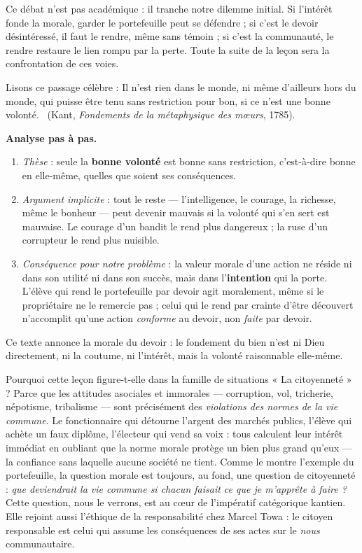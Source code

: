 \documentclass[11pt]{article}
\newcounter{popsec}
\newcounter{popsub}
\newcommand{\courssub}[1]{%
  \stepcounter{popsub}%
  \par\vspace{9pt}\noindent{\popxbold\fontsize{11.5}{13}\selectfont\color{popink}{\color{poporange}\thepopsec.\thepopsub}\hspace{6pt}#1}\par\nopagebreak\vspace{4pt}
}
\begin{document}
Ce débat n'est pas académique : il tranche notre dilemme initial. Si l'intérêt fonde la morale, garder le portefeuille peut se défendre ; si c'est le devoir désintéressé, il faut le rendre, même sans témoin ; si c'est la communauté, le rendre restaure le lien rompu par la perte. Toute la suite de la leçon sera la confrontation de ces voies.

\begin{experience}
Lisons ce passage célèbre : \guillemotleft Il n'est rien dans le monde, ni même d'ailleurs hors du monde, qui puisse être tenu sans restriction pour bon, si ce n'est une bonne volonté. \guillemotright\ (Kant, \emph{Fondements de la métaphysique des mœurs}, 1785).

\textbf{Analyse pas à pas.}
\begin{enumerate}
  \item \emph{Thèse} : seule la \textbf{bonne volonté} est bonne sans restriction, c'est-à-dire bonne en elle-même, quelles que soient ses conséquences.
  \item \emph{Argument implicite} : tout le reste — l'intelligence, le courage, la richesse, même le bonheur — peut devenir mauvais si la volonté qui s'en sert est mauvaise. Le courage d'un bandit le rend plus dangereux ; la ruse d'un corrupteur le rend plus nuisible.
  \item \emph{Conséquence pour notre problème} : la valeur morale d'une action ne réside ni dans son utilité ni dans son succès, mais dans l'\textbf{intention} qui la porte. L'élève qui rend le portefeuille par devoir agit moralement, même si le propriétaire ne le remercie pas ; celui qui le rend par crainte d'être découvert n'accomplit qu'une action \emph{conforme} au devoir, non \emph{faite} par devoir.
\end{enumerate}
Ce texte annonce la morale du devoir : le fondement du bien n'est ni Dieu directement, ni la coutume, ni l'intérêt, mais la volonté raisonnable elle-même.
\end{experience}

\courssub{Enjeu citoyen : la morale et la vie en société}

Pourquoi cette leçon figure-t-elle dans la famille de situations « La citoyenneté » ? Parce que les attitudes asociales et immorales — corruption, vol, tricherie, népotisme, tribalisme — sont précisément des \emph{violations des normes de la vie commune}. Le fonctionnaire qui détourne l'argent des marchés publics, l'élève qui achète un faux diplôme, l'électeur qui vend sa voix : tous calculent leur intérêt immédiat en oubliant que la norme morale protège un bien plus grand qu'eux — la confiance sans laquelle aucune société ne tient. Comme le montre l'exemple du portefeuille, la question morale est toujours, au fond, une question de citoyenneté : \emph{que deviendrait la vie commune si chacun faisait ce que je m'apprête à faire ?} Cette question, nous le verrons, est au cœur de l'impératif catégorique kantien. Elle rejoint aussi l'éthique de la responsabilité chez Marcel Towa : le citoyen responsable est celui qui assume les conséquences de ses actes sur le \emph{nous} communautaire.
\end{document}
